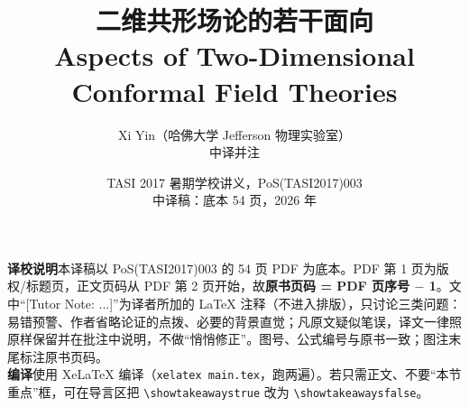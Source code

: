 \documentclass[11pt,a4paper]{article}
\title{\bfseries 二维共形场论的若干面向\\[4pt]
       \large Aspects of Two-Dimensional Conformal Field Theories}
\author{Xi Yin（哈佛大学 Jefferson 物理实验室）\\[2pt]
        \small 中译并注}
\date{TASI 2017 暑期学校讲义，PoS(TASI2017)003\\[2pt]
      \small 中译稿：底本 54 页，2026 年}
\numberwithin{equation}{section}
\begin{document}
\maketitle
\thispagestyle{empty}

\begin{center}
\begin{minipage}{0.86\textwidth}
\small
\textbf{译校说明}\quad 本译稿以 PoS(TASI2017)003 的 54 页 PDF 为底本。PDF 第 1 页为版权/标题页，正文页码从 PDF 第 2 页开始，故\textbf{原书页码 = PDF 页序号 $-$ 1}。文中“[Tutor Note: ...]”为译者所加的 LaTeX 注释（不进入排版），只讨论三类问题：易错预警、作者省略论证的点拨、必要的背景直觉；凡原文疑似笔误，译文一律照原样保留并在批注中说明，不做“悄悄修正”。图号、公式编号与原书一致；图注末尾标注原书页码。\\
\textbf{编译}\quad 使用 XeLaTeX 编译（\texttt{xelatex main.tex}，跑两遍）。若只需正文、不要“本节重点”框，可在导言区把 \texttt{\textbackslash showtakeawaystrue} 改为 \texttt{\textbackslash showtakeawaysfalse}。
\end{minipage}
\end{center}

\vspace{1em}
\tableofcontents
\newpage












\end{document}

